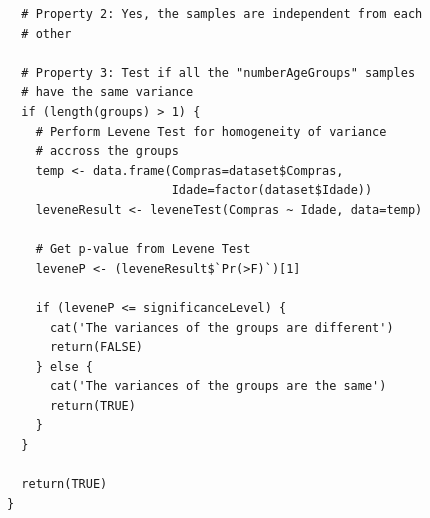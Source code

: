 \documentclass[12pt]{article}
\begin{document}
\begin{lstlisting}
  # Property 2: Yes, the samples are independent from each
  # other

  # Property 3: Test if all the "numberAgeGroups" samples
  # have the same variance
  if (length(groups) > 1) {
    # Perform Levene Test for homogeneity of variance
    # accross the groups
    temp <- data.frame(Compras=dataset$Compras,
                       Idade=factor(dataset$Idade))
    leveneResult <- leveneTest(Compras ~ Idade, data=temp)

    # Get p-value from Levene Test
    leveneP <- (leveneResult$`Pr(>F)`)[1]

    if (leveneP <= significanceLevel) {
      cat('The variances of the groups are different')
      return(FALSE)
    } else {
      cat('The variances of the groups are the same')
      return(TRUE)
    }
  }

  return(TRUE)
}
\end{lstlisting}
\end{document}
